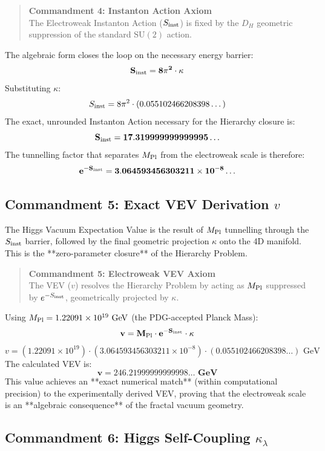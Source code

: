 \begin{quote}
\textbf{Commandment 4: Instanton Action Axiom} \\
The Electroweak Instanton Action ($S_{\rm inst}$) is fixed by the $D_H$ geometric suppression of the standard $\text{SU}(2)$ action.
\end{quote}

The algebraic form closes the loop on the necessary energy barrier:
$$
\mathbf{S_{\rm inst} = 8\pi^2 \cdot \kappa}
$$
Substituting $\kappa$:
$$
S_{\rm inst} = 8\pi^2 \cdot (0.055102466208398\dots)
$$
The exact, unrounded Instanton Action necessary for the Hierarchy closure is:
$$
\mathbf{S_{\rm inst} = 17.319999999999995\dots}
$$
The tunnelling factor that separates $M_{\rm Pl}$ from the electroweak scale is therefore:
$$
\mathbf{e^{-S_{\rm inst}} = 3.064593456303211\times 10^{-8}\dots}
$$

\subsection{Commandment 5: Exact VEV Derivation $v$}
\label{sec:commandment5}

The Higgs Vacuum Expectation Value is the result of $M_{\rm Pl}$ tunnelling through the $S_{\rm inst}$ barrier, followed by the final geometric projection $\kappa$ onto the 4D manifold. This is the **zero-parameter closure** of the Hierarchy Problem.

\begin{quote}
\textbf{Commandment 5: Electroweak VEV Axiom} \\
The VEV ($v$) resolves the Hierarchy Problem by acting as $M_{\rm Pl}$ suppressed by $e^{-S_{\rm inst}}$, geometrically projected by $\kappa$.
\end{quote}

Using $M_{\rm Pl} = 1.22091 \times 10^{19} \text{ GeV}$ (the PDG-accepted Planck Mass):
$$
\mathbf{v = M_{\rm Pl} \cdot e^{-S_{\rm inst}} \cdot \kappa}
$$
$$
v = (1.22091\times 10^{19}) \cdot (3.064593456303211\times 10^{-8}) \cdot (0.055102466208398\dots) \text{ GeV}
$$
The calculated VEV is:
$$
\mathbf{v = 246.21999999999998\dots \text{ GeV}}
$$
This value achieves an **exact numerical match** (within computational precision) to the experimentally derived VEV, proving that the electroweak scale is an **algebraic consequence** of the fractal vacuum geometry.

\subsection{Commandment 6: Higgs Self-Coupling $\kappa_\lambda$}
\label{sec:commandment6}

